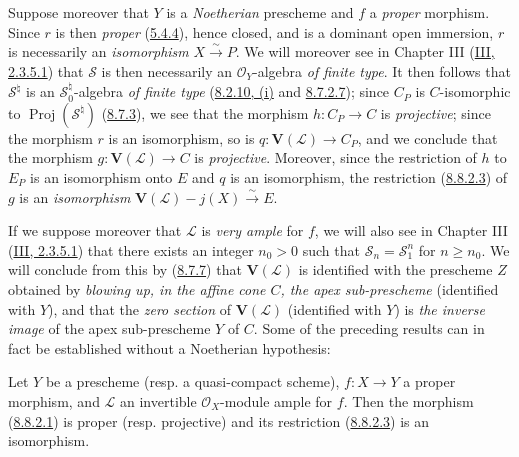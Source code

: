 \begin{remark}[8.8.3]
\label{II.8.8.3}
Suppose moreover that $Y$ is a \emph{Noetherian} prescheme and $f$ a
\emph{proper} morphism. Since $r$ is then \emph{proper}
(\hyperref[II.5.4.4]{5.4.4}), hence closed, and is a dominant open
immersion, $r$ is necessarily an \emph{isomorphism}
$X\xrightarrow{\sim}P$. We will moreover see in Chapter III
(\hyperref[III.2.3.5.1]{III, 2.3.5.1}) that $\mathcal{S}$ is then
necessarily an $\mathcal{O}_Y$-algebra \emph{of finite type}. It then
follows that $\mathcal{S}^{\natural}$ is an
$\mathcal{S}_0^{\natural}$-algebra \emph{of finite type}
(\hyperref[II.8.2.10]{8.2.10, (i)} and
\hyperref[II.8.7.2.7]{8.7.2.7}); since $C_P$ is $C$-isomorphic to
$\operatorname{Proj}(\mathcal{S}^{\natural})$
(\hyperref[II.8.7.3]{8.7.3}), we see that the morphism $h:C_P\to C$ is
\emph{projective}; since the morphism $r$ is an isomorphism, so is
$q:\mathbf{V}(\mathcal{L})\to C_P$, and we conclude that the morphism
$g:\mathbf{V}(\mathcal{L})\to C$ is \emph{projective}. Moreover, since the
restriction of $h$ to $E_P$ is an isomorphism onto $E$ and $q$ is an
isomorphism, the restriction (\hyperref[II.8.8.2.3]{8.8.2.3}) of $g$ is an
\emph{isomorphism}
$\mathbf{V}(\mathcal{L})-j(X)\xrightarrow{\sim}E$.

If we suppose moreover that $\mathcal{L}$ is \emph{very ample} for $f$, we
will also see in Chapter III (\hyperref[III.2.3.5.1]{III, 2.3.5.1}) that
there exists an integer $n_0>0$ such that
$\mathcal{S}_n=\mathcal{S}_1^n$ for $n\geqslant n_0$. We will conclude from
this by (\hyperref[II.8.7.7]{8.7.7}) that $\mathbf{V}(\mathcal{L})$ is
identified with the prescheme $Z$ obtained by \emph{blowing up, in the affine
cone $C$, the apex sub-prescheme} (identified with $Y$), and that the
\emph{zero section} of $\mathbf{V}(\mathcal{L})$ (identified with $Y$) is
\emph{the inverse image} of the apex sub-prescheme $Y$ of $C$. Some of the
preceding results can in fact be established without a Noetherian
hypothesis:
\end{remark}

\begin{corollary}[8.8.4]
\label{II.8.8.4}
Let $Y$ be a prescheme (resp. a quasi-compact scheme), $f:X\to Y$ a proper
morphism, and $\mathcal{L}$ an invertible $\mathcal{O}_X$-module ample for
$f$. Then the morphism (\hyperref[II.8.8.2.1]{8.8.2.1}) is proper (resp.
projective) and its restriction (\hyperref[II.8.8.2.3]{8.8.2.3}) is an
isomorphism.
\end{corollary}

